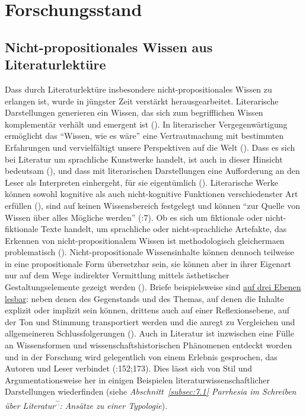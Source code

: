 \documentclass[fontsize=12pt]{scrartcl}
\begin{document}
\newpage

\section{Forschungsstand}
\label{sec:3}

\subsection{Nicht-pro\-po\-si\-ti\-o\-na\-les Wissen aus Literaturlekt\"ure}
\label{subsec:3.1}

Dass durch Li\-te\-ra\-tur\-lekt\"ure insbesondere nicht-pro\-po\-si\-ti\-o\-na\-les Wissen zu erlangen ist, wurde in j\"ungster Zeit verst\"arkt he\-rausgearbeitet. Li\-te\-ra\-rische Darstellungen generieren ein Wissen, das sich zum begrifflichen Wissen komplement\"ar verh\"alt und emergent ist (\cite{Klinkert2011}). In li\-te\-ra\-rischer Vergegenw\"artigung erm\"oglicht das "`Wissen, wie es w\"are"' eine Vertrautmachung mit bestimmten Erfah\-rungen und vervielf\"altigt unsere Perspektiven auf die Welt (\cite{Ferran2014}). Dass es sich bei Li\-te\-ra\-tur um sprachliche Kunstwerke handelt, ist auch in dieser Hinsicht bedeutsam (\cite{Huemer2014}), und dass mit li\-te\-ra\-rischen Darstellungen eine Aufforderung an den Leser\textsuperscript{\tiny *} als Interpreten\textsuperscript{\tiny *} einhergeht, f\"ur sie eigent\"umlich (\cite{Vesper2014}). Li\-te\-ra\-rische Werke k\"onnen sowohl kognitive als auch nicht-kognitive Funktionen verschiedenster Art erf\"ullen (\cite{Reicher2014}), sind auf keinen \flq Wissensbereich\frq \,\,festgelegt und k\"onnen "`zur Quelle von Wissen \"uber alles M\"ogliche werden"' (\cite{Koppe2011}:7). Ob es sich um fiktionale oder nicht-fiktionale Texte handelt, um sprachliche oder nicht-sprachliche Artefakte, das Erkennen von nicht-pro\-po\-si\-ti\-o\-na\-lem Wissen ist methodologisch glei\-cherma\-{\ss}en pro\-blematisch (\cite{DannebergSpoerhase2011}). Nicht-pro\-po\-si\-ti\-o\-na\-le Wissensinhalte k\"onnen dennoch teilweise in eine pro\-po\-si\-ti\-o\-na\-le Form \flq \"ubersetzbar\frq \,\,sein, sie k\"onnen aber in ihrer Eigenart nur auf dem Wege indirekter Ver\-mitt\-lung mittels \"asthetischer Gestaltungselemente gezeigt werden (\cite{Albrecht2011}). Briefe beispielsweise sind \href{https://www.uni-marburg.de/fb03/philosophie/institut/mitarbeiter/vendrell/form-inhalt_vendrell-wille.pdf}{auf drei Ebenen lesbar}: neben denen des Gegenstands und des Themas, auf denen die Inhalte explizit oder implizit sein k\"onnen, drittens auch auf einer Reflexionsebene, auf der Ton und Stimmung transportiert werden und die anregt zu Vergleichen und allgemeineren Schlussfolgerungen (\cite{FerranWille2012}). Auch in Li\-te\-ra\-tur ist inzwischen eine F\"ulle an Wissensformen und wissenschaftshistorischen Ph\"anomenen entdeckt worden und in der For\-schung wird gelegentlich von einem Erlebnis gesprochen, das Autoren\textsuperscript{\tiny *} und Leser\textsuperscript{\tiny *} verbindet (\cite{Erhart2014}:152;173). Dies l\"asst sich von Stil und Argumentationsweise her in einigen Beispielen li\-te\-ra\-tur\-wissenschaftlicher Darstellungen wiederfinden (siehe \textit{Abschnitt~\ref{subsec:7.1} \textit{Parrhesia} im Schrei\-ben \"uber Li\-te\-ra\-tur\textsuperscript{\~.\~.}: Ans\"atze zu einer Typologie}). 
\end{document}
